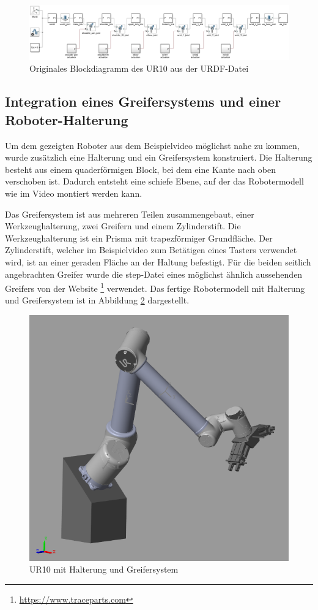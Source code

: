 \begin{figure}[!htbp]
	\centering
	\includegraphics[width=1.0\linewidth]{grafic/origin_UR10_modell}
	\caption{Originales Blockdiagramm des UR10 aus der URDF-Datei}
	\label{fig:ur10_origin_modell}
\end{figure}


\subsection{Integration eines Greifersystems und einer Roboter-Halterung}

Um dem gezeigten Roboter aus dem Beispielvideo möglichst nahe zu kommen, wurde zusätzlich eine Halterung und ein Greifersystem konstruiert.
Die Halterung besteht aus einem quaderförmigen Block, bei dem eine Kante nach oben verschoben ist. %
Dadurch entsteht eine schiefe Ebene, auf der das Robotermodell wie im Video montiert werden kann.

Das Greifersystem ist aus mehreren Teilen zusammengebaut, einer Werkzeughalterung, zwei Greifern und einem Zylinderstift.
Die Werkzeughalterung ist ein Prisma mit trapezförmiger Grundfläche.
Der Zylinderstift, welcher im Beispielvideo zum Betätigen eines Tasters verwendet wird, ist an einer geraden Fläche an der Haltung befestigt.
Für die beiden seitlich angebrachten Greifer wurde die step-Datei eines möglichst ähnlich aussehenden Greifers von der Website \footnote{\url{https://www.traceparts.com}} verwendet.
Das fertige Robotermodell mit Halterung und Greifersystem ist in Abbildung \ref{fig:ur10_greifer} dargestellt.

\begin{figure}[!htbp]
	\centering
	\includegraphics[width=0.5\linewidth]{grafic/UR10_Greifer}
	\caption{UR10 mit Halterung und Greifersystem}
	\label{fig:ur10_greifer}
\end{figure}


